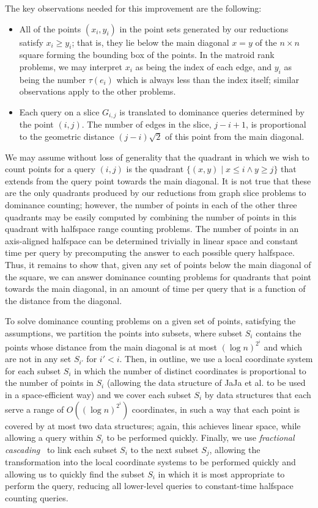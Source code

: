 \documentclass[11pt]{article}
\begin{document}
The key observations needed for this improvement are the following:
\begin{itemize}
\item
All of the points $(x_i,y_i)$ in the point sets generated by our reductions satisfy $x_i\ge y_i$; that is, they lie below the main diagonal $x=y$ of the $n\times n$ square forming the bounding box of the points.
In the matroid rank problems, we may interpret $x_i$ as being the index of each edge, and $y_i$ as being the number $\tau(e_i)$ which is always less than the index itself; similar observations apply to the other problems.
\item
Each query on a slice $G_{i,j}$ is translated to dominance queries determined by the point $(i,j)$. The number of edges in the slice, $j-i+1$, is proportional to the geometric distance $(j-i)\sqrt 2$ of this point from the main diagonal.
\end{itemize}

We may assume without loss of generality that the quadrant in which we wish to count points for a query $(i,j)$ is the quadrant $\{(x,y)\mid x\le i \wedge y\ge j\}$ that extends from the query point towards the main diagonal. It is not true that these are the only quadrants produced by our reductions from graph slice problems to dominance counting; however, the number of points in each of the other three quadrants may be easily computed by combining the number of points in this quadrant with halfspace range counting problems. The number of points in an axis-aligned halfspace can be determined trivially in linear space and constant time per query by precomputing the answer to each possible query halfspace.
Thus, it remains to show that, given any set of points below the main diagonal of the square, we can answer dominance counting problems for quadrants that point towards the main diagonal, in an amount of time per query that is a function of the distance from the diagonal.

To solve dominance counting problems on a given set of points, satisfying the assumptions, we partition the points into subsets, where subset $S_i$ contains the points whose distance from the main diagonal is at most $(\log n)^{2^i}$ and which are not in any set $S_{i'}$ for $i'<i$.
Then, in outline, we use a local coordinate system for each subset $S_i$ in which the number of distinct coordinates is proportional to the number of points in $S_i$ (allowing the data structure of JaJa et al. to be used in a space-efficient way) and we cover each subset $S_i$ by data structures that each serve a range of $O((\log n)^{2^i})$ coordinates, in such a way that each point is covered by at most two data structures; again, this achieves linear space, while allowing a query within $S_i$ to be performed quickly. Finally, we use \emph{fractional cascading}~\cite{ChaGui-Algo-86} to link each subset $S_i$ to the next subset $S_j$, allowing the transformation into the local coordinate systems to be performed quickly and allowing us to quickly find the subset $S_i$ in which it is most appropriate to perform the query, reducing all lower-level queries to constant-time halfspace counting queries.
\end{document}
